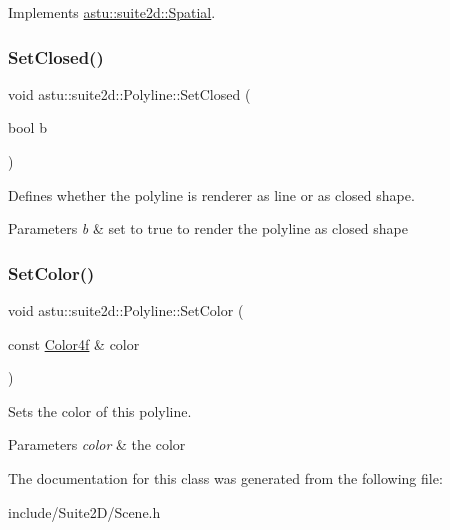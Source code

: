 Implements \hyperlink{classastu_1_1suite2d_1_1Spatial_afaf7797d00a432012298535ba11348b7}{astu\+::suite2d\+::\+Spatial}.

\mbox{\label{classastu_1_1suite2d_1_1Polyline_a92eb9c238bcdcf9c826f609c3ffa357d}} 
\subsubsection{\texorpdfstring{Set\+Closed()}{SetClosed()}}
{\footnotesize\ttfamily void astu\+::suite2d\+::\+Polyline\+::\+Set\+Closed (\begin{DoxyParamCaption}\item[{bool}]{b }\end{DoxyParamCaption})}

Defines whether the polyline is renderer as line or as closed shape.


\begin{DoxyParams}{Parameters}
{\em b} & set to {\ttfamily true} to render the polyline as closed shape \\
\hline
\end{DoxyParams}
\mbox{\label{classastu_1_1suite2d_1_1Polyline_a2fb760ad09c0dbcfc9128a8b04bb312f}} 
\subsubsection{\texorpdfstring{Set\+Color()}{SetColor()}}
{\footnotesize\ttfamily void astu\+::suite2d\+::\+Polyline\+::\+Set\+Color (\begin{DoxyParamCaption}\item[{const \hyperlink{classastu_1_1Color}{Color4f} \&}]{color }\end{DoxyParamCaption})}

Sets the color of this polyline.


\begin{DoxyParams}{Parameters}
{\em color} & the color \\
\hline
\end{DoxyParams}


The documentation for this class was generated from the following file\+:\begin{DoxyCompactItemize}
\item 
include/\+Suite2\+D/Scene.\+h\end{DoxyCompactItemize}
